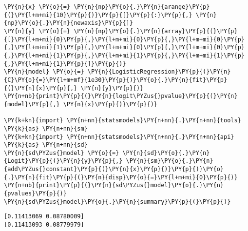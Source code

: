 \begin{tcolorbox}[breakable, size=fbox, boxrule=1pt, pad at break*=1mm,colback=cellbackground, colframe=cellborder]
\begin{Verbatim}[commandchars=\\\{\}]
\PY{n}{x} \PY{o}{=} \PY{n}{np}\PY{o}{.}\PY{n}{arange}\PY{p}{(}\PY{l+m+mi}{10}\PY{p}{)}\PY{p}{[}\PY{p}{:}\PY{p}{,} \PY{n}{np}\PY{o}{.}\PY{n}{newaxis}\PY{p}{]}
\PY{n}{y} \PY{o}{=} \PY{n}{np}\PY{o}{.}\PY{n}{array}\PY{p}{(}\PY{p}{[}\PY{l+m+mi}{0}\PY{p}{,}\PY{l+m+mi}{0}\PY{p}{,}\PY{l+m+mi}{0}\PY{p}{,}\PY{l+m+mi}{1}\PY{p}{,}\PY{l+m+mi}{0}\PY{p}{,}\PY{l+m+mi}{0}\PY{p}{,}\PY{l+m+mi}{1}\PY{p}{,}\PY{l+m+mi}{1}\PY{p}{,}\PY{l+m+mi}{1}\PY{p}{,}\PY{l+m+mi}{1}\PY{p}{]}\PY{p}{)}
\PY{n}{model} \PY{o}{=} \PY{n}{LogisticRegression}\PY{p}{(}\PY{n}{C}\PY{o}{=}\PY{l+m+mf}{1e30}\PY{p}{)}\PY{o}{.}\PY{n}{fit}\PY{p}{(}\PY{n}{x}\PY{p}{,} \PY{n}{y}\PY{p}{)}
\PY{n+nb}{print}\PY{p}{(}\PY{n}{logit\PYZus{}pvalue}\PY{p}{(}\PY{n}{model}\PY{p}{,} \PY{n}{x}\PY{p}{)}\PY{p}{)}

\PY{k+kn}{import} \PY{n+nn}{statsmodels}\PY{n+nn}{.}\PY{n+nn}{tools} \PY{k}{as} \PY{n+nn}{sm}
\PY{k+kn}{import} \PY{n+nn}{statsmodels}\PY{n+nn}{.}\PY{n+nn}{api} \PY{k}{as} \PY{n+nn}{sd}
\PY{n}{sd\PYZus{}model} \PY{o}{=} \PY{n}{sd}\PY{o}{.}\PY{n}{Logit}\PY{p}{(}\PY{n}{y}\PY{p}{,} \PY{n}{sm}\PY{o}{.}\PY{n}{add\PYZus{}constant}\PY{p}{(}\PY{n}{x}\PY{p}{)}\PY{p}{)}\PY{o}{.}\PY{n}{fit}\PY{p}{(}\PY{n}{disp}\PY{o}{=}\PY{l+m+mi}{0}\PY{p}{)}
\PY{n+nb}{print}\PY{p}{(}\PY{n}{sd\PYZus{}model}\PY{o}{.}\PY{n}{pvalues}\PY{p}{)}
\PY{n}{sd\PYZus{}model}\PY{o}{.}\PY{n}{summary}\PY{p}{(}\PY{p}{)}
\end{Verbatim}
\end{tcolorbox}

    \begin{Verbatim}[commandchars=\\\{\}]
[0.11413069 0.08780009]
[0.11413093 0.08779979]
    \end{Verbatim}

